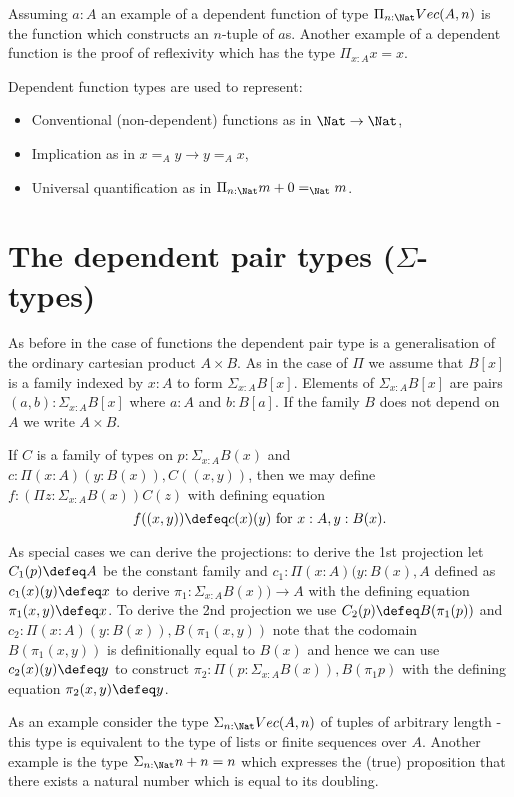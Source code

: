 {Assuming $a:A$ an example of a dependent function of type $\Pi_{n:\Nat}Vec(A,n)$
is the function which constructs an $n$-tuple of $a$s. Another example
of a dependent function is the proof of reflexivity which has the type
$\Pi_{x:A}x = x$.

Dependent function types are used to represent:
\begin{itemize}
\item Conventional (non-dependent) functions as in $\Nat \to \Nat$,
\item Implication as in $x =_A y \to y =_A x$,
\item Universal quantification as in $\Pi_{n:\Nat}m+0 =_\Nat m$.
\end{itemize}

\section{The dependent pair types ($\Sigma$-types)}
\label{sec:sigma-types}

As before in the case of functions the dependent pair type is a
generalisation of the ordinary cartesian product $A \times B$. 
As in the case of $\Pi$ we assume that $B[x]$ is a family indexed by
$x:A$ to form $\Sigma_{x:A}B[x]$. Elements of $\Sigma_{x:A}B[x]$ are
pairs $(a,b) : \Sigma_{x:A}B[x]$ where $a:A$ and $b:B[a]$. If the
family $B$ does not depend on $A$ we write $A \times B$.

If $C$ is a family of types on $p:\Sigma_{x:A}B(x)$ and 
$c:\Pi(x:A)(y:B(x)),C((x,y))$, then we may define 
$f:(\Pi z:\Sigma_{x:A}B(x))C(z)$ with defining equation
  \[f((x,y))\defeq c(x)(y)\mbox{ for } x:A,y:B(x).\]

As special cases we can derive the projections: to derive the 1st
projection let $C_1(p) \defeq A$ be the constant family and $c_1 : \Pi (x:A)(y:B(x),A$
defined as $c_1(x)(y) \defeq x$ to derive $\pi_1 : \Sigma_{x:A}B(x)) \to A$
with the defining equation $\pi_1 (x,y) \defeq x$. To derive the 2nd
projection we use $C_2(p) \defeq B (\pi_1(p))$ and $c_2 : \Pi
(x:A)(y:B(x)),B(\pi_1(x,y))$ note that the codomain $B(\pi_1(x,y))$ is
definitionally equal to $B(x)$ and hence we can use $c_2(x)(y) \defeq
y$ to construct $\pi_2 : \Pi(p : \Sigma_{x:A}{B(x)}),B(\pi_1 p)$ with
the defining equation $\pi_2(x,y) \defeq y$.

As an example consider the type $\Sigma_{n:\Nat}Vec(A,n)$ of tuples of
arbitrary length - this type is equivalent to the type of lists or
finite sequences over $A$. Another example is the type
$\Sigma_{n:\Nat}n+n = n$ which expresses the (true) proposition that
there exists a natural number which is equal to its doubling.

}
